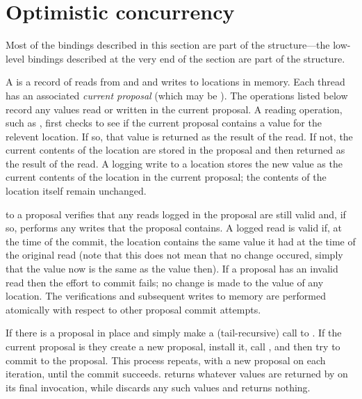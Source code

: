 \section{Optimistic concurrency}

Most of the bindings described in this section are part of the 
structure---the low-level bindings described at the very end of the
section are part of the  structure.

A  is a record of reads from and and writes to locations in
 memory.  Each thread has an associated \textit{current proposal}
 (which may be ).
The  operations listed below record any values read or
 written in the current proposal.
A reading operation, such as , first checks to
 see if the current proposal contains a value for the relevent location.
If so, that value is returned as the result of the read.
If not, the current contents of the location are stored in the proposal and
 then returned as the result of the read.
A logging write to a location stores the new value as the current contents of
 the location in the current proposal; the contents of the location itself
 remain unchanged.

 to a proposal verifies that any reads logged in
 the proposal are still valid and, if so, performs any writes that
 the proposal contains.
A logged read is valid if, at the time of the commit, the location contains
 the same value it had at the time of the original read (note that this does
 not mean that no change occured, simply that the value now is the same as
 the value then).
If a proposal has an invalid read then the effort to commit fails; no change
 is made to the value of any location.
The verifications and subsequent writes to memory are performed atomically
 with respect to other proposal commit attempts.

\begin{protos}
\end{protos}
\noindent
If there is a proposal in place 
  and 
 simply make a (tail-recursive) call to .
If the current proposal is  they create a new proposal,
 install it, call , and then try to commit to the proposal.
This process repeats, with a new proposal on each iteration, until
 the commit succeeds.
 returns whatever values are returned by 
 on its final invocation, while  discards any such
 values and returns nothing.

